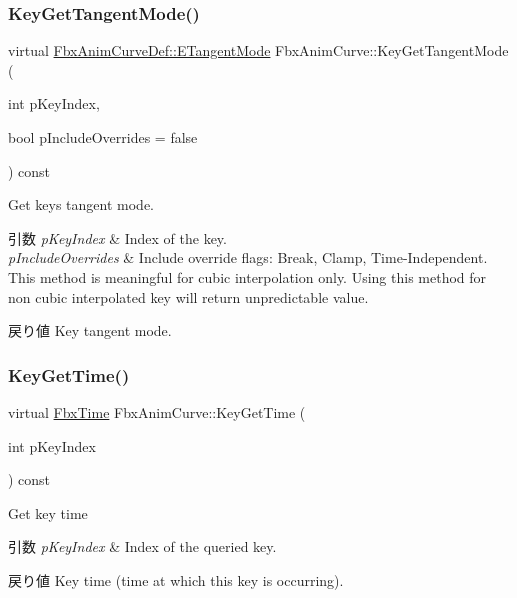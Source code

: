 \subsubsection{\texorpdfstring{Key\+Get\+Tangent\+Mode()}{KeyGetTangentMode()}}
{\footnotesize\ttfamily virtual \hyperlink{class_fbx_anim_curve_def_ac810ccc5ca0527704ab5175479964b87}{Fbx\+Anim\+Curve\+Def\+::\+E\+Tangent\+Mode} Fbx\+Anim\+Curve\+::\+Key\+Get\+Tangent\+Mode (\begin{DoxyParamCaption}\item[{int}]{p\+Key\+Index,  }\item[{bool}]{p\+Include\+Overrides = {\ttfamily false} }\end{DoxyParamCaption}) const\hspace{0.3cm}{\ttfamily [pure virtual]}}

Get key\textquotesingle{}s tangent mode. 
\begin{DoxyParams}{引数}
{\em p\+Key\+Index} & Index of the key. \\
\hline
{\em p\+Include\+Overrides} & Include override flags\+: Break, Clamp, Time-\/\+Independent. This method is meaningful for cubic interpolation only. Using this method for non cubic interpolated key will return unpredictable value. \\
\hline
\end{DoxyParams}
\begin{DoxyReturn}{戻り値}
Key tangent mode. 
\end{DoxyReturn}
\mbox{\label{class_fbx_anim_curve_a547f7842ea7bae5b5ed048d15b8b0d07}} 
\subsubsection{\texorpdfstring{Key\+Get\+Time()}{KeyGetTime()}}
{\footnotesize\ttfamily virtual \hyperlink{class_fbx_time}{Fbx\+Time} Fbx\+Anim\+Curve\+::\+Key\+Get\+Time (\begin{DoxyParamCaption}\item[{int}]{p\+Key\+Index }\end{DoxyParamCaption}) const\hspace{0.3cm}{\ttfamily [pure virtual]}}

Get key time 
\begin{DoxyParams}{引数}
{\em p\+Key\+Index} & Index of the queried key. \\
\hline
\end{DoxyParams}
\begin{DoxyReturn}{戻り値}
Key time (time at which this key is occurring). 
\end{DoxyReturn}


